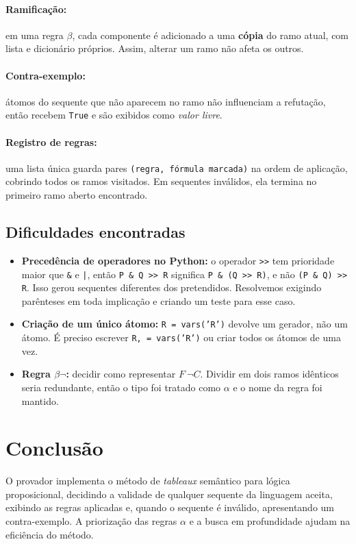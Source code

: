 \documentclass[12pt,a4paper]{article}
\begin{document}
\paragraph{Ramificação:} em uma regra $\beta$, cada componente é adicionado a uma \textbf{cópia} do ramo atual, com lista e dicionário próprios. Assim, alterar um ramo não afeta os outros.

\paragraph{Contra-exemplo:} átomos do sequente que não aparecem no ramo não influenciam a refutação, então recebem \texttt{True} e são exibidos como \textit{valor livre}.

\paragraph{Registro de regras:} uma lista única guarda pares \texttt{(regra, fórmula marcada)} na ordem de aplicação, cobrindo todos os ramos visitados. Em sequentes inválidos, ela termina no primeiro ramo aberto encontrado.

\subsection{Dificuldades encontradas}
\begin{itemize}
    \item \textbf{Precedência de operadores no Python:} o operador \texttt{>>} tem prioridade maior que \texttt{\&} e \texttt{|}, então \texttt{P \& Q >> R} significa \texttt{P \& (Q >> R)}, e não \texttt{(P \& Q) >> R}. Isso gerou sequentes diferentes dos pretendidos. Resolvemos exigindo parênteses em toda implicação e criando um teste para esse caso.
    \item \textbf{Criação de um único átomo:} \texttt{R = vars('R')} devolve um gerador, não um átomo. É preciso escrever \texttt{R, = vars('R')} ou criar todos os átomos de uma vez.
    \item \textbf{Regra $\beta\neg$:} decidir como representar $F\ \neg C$. Dividir em dois ramos idênticos seria redundante, então o tipo foi tratado como $\alpha$ e o nome da regra foi mantido.
\end{itemize}

\section{Conclusão}
O provador implementa o método de \textit{tableaux} semântico para lógica proposicional, decidindo a validade de qualquer sequente da linguagem aceita, exibindo as regras aplicadas e, quando o sequente é inválido, apresentando um contra-exemplo. A priorização das regras $\alpha$ e a busca em profundidade ajudam na eficiência do método.
\end{document}
